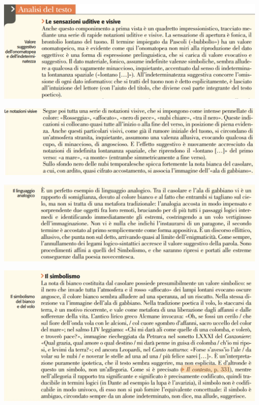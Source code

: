 \documentclass[a4paper, twoside, titlepage]{book}
\begin{document}
\begin{center}
\includegraphics[width=\textwidth]{temporale1}
\end{center}

\begin{center}
\includegraphics[width=\textwidth]{temporale2}
\end{center}
\vfill
\begin{center}
\includegraphics[width=\textwidth]{temporale3}
\end{center}

\begin{center}
\includegraphics[width=\textwidth]{temporale4}
\end{center}
\end{document}
